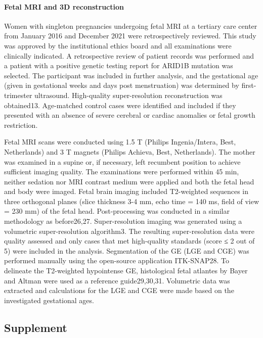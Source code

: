 \paragraph{Fetal MRI and 3D reconstruction}
Women with singleton pregnancies undergoing fetal MRI at a tertiary care center from January 2016 and December 2021 were retrospectively reviewed. This study was approved by the institutional ethics board and all examinations were clinically indicated. A retrospective review of patient records was performed and a patient with a positive genetic testing report for ARID1B mutation was selected. The participant was included in further analysis, and the gestational age (given in gestational weeks and days post menstruation) was determined by first-trimester ultrasound. High-quality super-resolution reconstruction was obtained13. Age-matched control cases were identified and included if they presented with an absence of severe cerebral or cardiac anomalies or fetal growth restriction. 

Fetal MRI scans were conducted using 1.5 T (Philips Ingenia/Intera, Best, Netherlands) and 3 T magnets (Philips Achieva, Best, Netherlands). The mother was examined in a supine or, if necessary, left recumbent position to achieve sufficient imaging quality. The examinations were performed within 45 min, neither sedation nor MRI contrast medium were applied and both the fetal head and body were imaged. Fetal brain imaging included T2-weighted sequences in three orthogonal planes (slice thickness 3-4 mm, echo time = 140 ms, field of view = 230 mm) of the fetal head. Post-processing was conducted in a similar methodology as before26,27. Super-resolution imaging was generated using a volumetric super-resolution algorithm3. The resulting super-resolution data were quality assessed and only cases that met high-quality standards (score ≤ 2 out of 5) were included in the analysis. Segmentation of the GE (LGE and CGE) was performed manually using the open-source application ITK-SNAP28. To delineate the T2-weighted hypointense GE, histological fetal atlantes by Bayer and Altman were used as a reference guide29,30,31. Volumetric data was extracted and calculations for the LGE and CGE were made based on the investigated gestational ages.





\clearpage

\subsection{Supplement}
\beginsupplement

